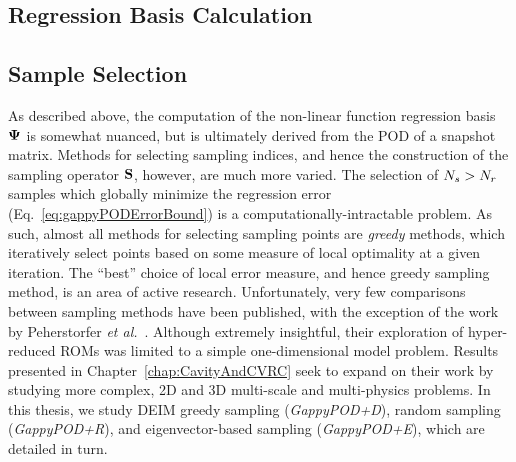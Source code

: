 
\subsection{Regression Basis Calculation}

\subsection{Sample Selection}

As described above, the computation of the non-linear function regression basis $\deimBasis$ is somewhat nuanced, but is ultimately derived from the POD of a snapshot matrix. Methods for selecting sampling indices, and hence the construction of the sampling operator $\mathbf{S}$, however, are much more varied. The selection of $N_s > N_r$ samples which globally minimize the regression error (Eq.~\ref{eq:gappyPODErrorBound}) is a computationally-intractable problem. As such, almost all methods for selecting sampling points are \textit{greedy} methods, which iteratively select points based on some measure of local optimality at a given iteration. The ``best'' choice of local error measure, and hence greedy sampling method, is an area of active research. Unfortunately, very few comparisons between sampling methods have been published, with the exception of the work by Peherstorfer \textit{et al.}~\cite{Peherstorfer2020}. Although extremely insightful, their exploration of hyper-reduced ROMs was limited to a simple one-dimensional model problem. Results presented in Chapter~\ref{chap:CavityAndCVRC} seek to expand on their work by studying more complex, 2D and 3D multi-scale and multi-physics problems. In this thesis, we study DEIM greedy sampling (\textit{GappyPOD+D}), random sampling (\textit{GappyPOD+R}), and eigenvector-based sampling (\textit{GappyPOD+E}), which are detailed in turn.

